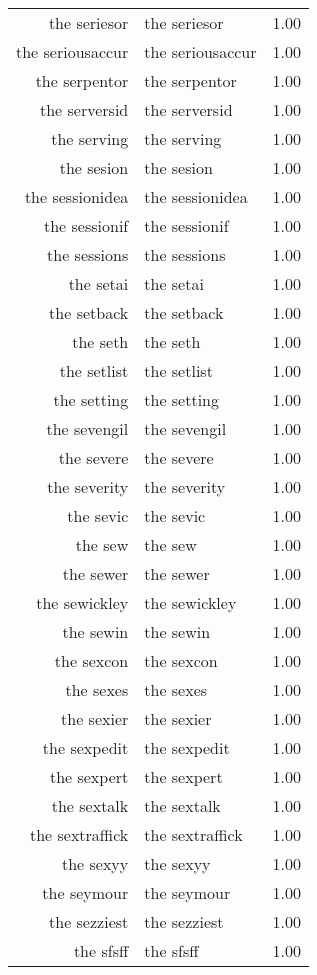 \begin{table}[ht]
\begin{tabular}{rlr}
  the seriesor & the seriesor & 1.00 \\ 
  the seriousaccur & the seriousaccur & 1.00 \\ 
  the serpentor & the serpentor & 1.00 \\ 
  the serversid & the serversid & 1.00 \\ 
  the serving & the serving & 1.00 \\ 
  the sesion & the sesion & 1.00 \\ 
  the sessionidea & the sessionidea & 1.00 \\ 
  the sessionif & the sessionif & 1.00 \\ 
  the sessions & the sessions & 1.00 \\ 
  the setai & the setai & 1.00 \\ 
  the setback & the setback & 1.00 \\ 
  the seth & the seth & 1.00 \\ 
  the setlist & the setlist & 1.00 \\ 
  the setting & the setting & 1.00 \\ 
  the sevengil & the sevengil & 1.00 \\ 
  the severe & the severe & 1.00 \\ 
  the severity & the severity & 1.00 \\ 
  the sevic & the sevic & 1.00 \\ 
  the sew & the sew & 1.00 \\ 
  the sewer & the sewer & 1.00 \\ 
  the sewickley & the sewickley & 1.00 \\ 
  the sewin & the sewin & 1.00 \\ 
  the sexcon & the sexcon & 1.00 \\ 
  the sexes & the sexes & 1.00 \\ 
  the sexier & the sexier & 1.00 \\ 
  the sexpedit & the sexpedit & 1.00 \\ 
  the sexpert & the sexpert & 1.00 \\ 
  the sextalk & the sextalk & 1.00 \\ 
  the sextraffick & the sextraffick & 1.00 \\ 
  the sexyy & the sexyy & 1.00 \\ 
  the seymour & the seymour & 1.00 \\ 
  the sezziest & the sezziest & 1.00 \\ 
  the sfsff & the sfsff & 1.00 \\ 

\end{tabular}
\end{table}
